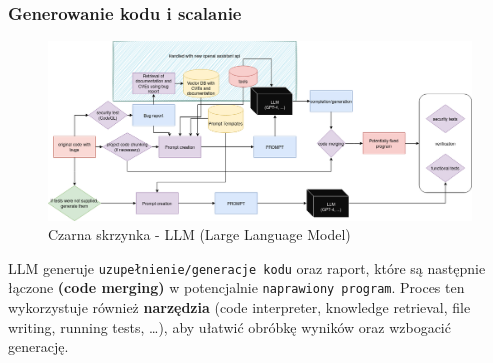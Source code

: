 \subsubsection{Generowanie kodu i scalanie}
\begin{figure}[h]
    \centering
    \includegraphics[clip, trim=12cm 6cm 6cm 0cm, width=0.9\linewidth]{img/gptester.drawio.png}
    \caption{Czarna skrzynka - LLM (Large Language Model)}
    \label{fig:przyciety_obraz-generowanie}
\end{figure}
LLM generuje \texttt{uzupełnienie/generacje kodu} oraz raport, które są następnie łączone \textbf{(code merging)} w potencjalnie \texttt{naprawiony program}. Proces ten wykorzystuje również \textbf{narzędzia}
(code interpreter, knowledge retrieval, file writing, running tests, \dots), aby ułatwić obróbkę wyników oraz wzbogacić generację.

